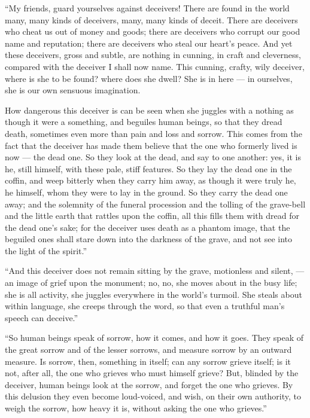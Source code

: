 \documentclass[12pt,a4paper]{book}
\begin{document}
``My friends, guard yourselves against deceivers! There are found in the world many, many kinds of deceivers, many, many kinds of deceit. There are deceivers who cheat us out of money and goods; there are deceivers who corrupt our good name and reputation; there are deceivers who steal our heart's peace. And yet these deceivers, gross and subtle, are nothing in cunning, in craft and cleverness, compared with the deceiver I shall now name. This cunning, crafty, wily deceiver, where is she to be found? where does she dwell? She is in here --- in ourselves, she is our own sensuous imagination.

How dangerous this deceiver is can be seen when she juggles with a nothing as though it were a something, and beguiles human beings, so that they dread death, sometimes even more than pain and loss and sorrow. This comes from the fact that the deceiver has made them believe that the one who formerly lived is now --- the dead one. So they look at the dead, and say to one another: yes, it is he, still himself, with these pale, stiff features. So they lay the dead one in the coffin, and weep bitterly when they carry him away, as though it were truly he, he himself, whom they were to lay in the ground. So they carry the dead one away; and the solemnity of the funeral procession and the tolling of the grave-bell and the little earth that rattles upon the coffin, all this fills them with dread for the dead one's sake; for the
deceiver uses death as a phantom image, that the beguiled ones shall stare down into the darkness of the grave, and not see into the light of the spirit.''

``And this deceiver does not remain sitting by the grave, motionless and silent, --- an image of grief upon the monument; no, no, she moves about in the busy life; she is all activity, she juggles everywhere in the world's turmoil. She steals about within language, she creeps through the word, so that even a truthful man's speech can deceive.''

``So human beings speak of sorrow, how it comes, and how it goes. They speak of the great sorrow and of the lesser sorrows, and measure sorrow by an outward measure. Is sorrow, then, something in itself; can any sorrow grieve itself; is it not, after all, the one who grieves who must himself grieve? But, blinded by the deceiver, human beings look at the sorrow, and forget the one who grieves. By this delusion they even become loud-voiced, and wish, on their own authority, to weigh the sorrow, how heavy it is, without asking the one who grieves.''
\end{document}
